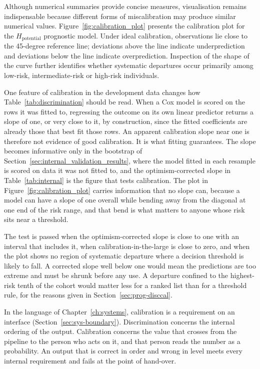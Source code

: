 Although numerical summaries provide concise measures, visualisation remains indispensable because different forms of miscalibration may produce similar numerical values. Figure~\ref{fig:calibration_plot} presents the calibration plot for the $H_{\text{potential}}$ prognostic model. Under ideal calibration, observations lie close to the 45-degree reference line; deviations above the line indicate underprediction and deviations below the line indicate overprediction. Inspection of the shape of the curve further identifies whether systematic departures occur primarily among low-risk, intermediate-risk or high-risk individuals.

One feature of calibration in the development data changes how Table~\ref{tab:discrimination} should be read. When a Cox model is scored on the rows it was fitted to, regressing the outcome on its own linear predictor returns a slope of one, or very close to it, by construction, since the fitted coefficients are already those that best fit those rows. An apparent calibration slope near one is therefore not evidence of good calibration. It is what fitting guarantees. The slope becomes informative only in the bootstrap of Section~\ref{sec:internal_validation_results}, where the model fitted in each resample is scored on data it was not fitted to, and the optimism-corrected slope in Table~\ref{tab:internal} is the figure that tests calibration. The plot in Figure~\ref{fig:calibration_plot} carries information that no slope can, because a model can have a slope of one overall while bending away from the diagonal at one end of the risk range, and that bend is what matters to anyone whose risk sits near a threshold.

The test is passed when the optimism-corrected slope is close to one with an interval that includes it, when calibration-in-the-large is close to zero, and when the plot shows no region of systematic departure where a decision threshold is likely to fall. A corrected slope well below one would mean the predictions are too extreme and must be shrunk before any use. A departure confined to the highest-risk tenth of the cohort would matter less for a ranked list than for a threshold rule, for the reasons given in Section~\ref{sec:prog-disccal}.

In the language of Chapter~\ref{ch:systems}, calibration is a requirement on an interface (Section~\ref{sec:sys-boundary}). Discrimination concerns the internal ordering of the output. Calibration concerns the value that crosses from the pipeline to the person who acts on it, and that person reads the number as a probability. An output that is correct in order and wrong in level meets every internal requirement and fails at the point of hand-over.

